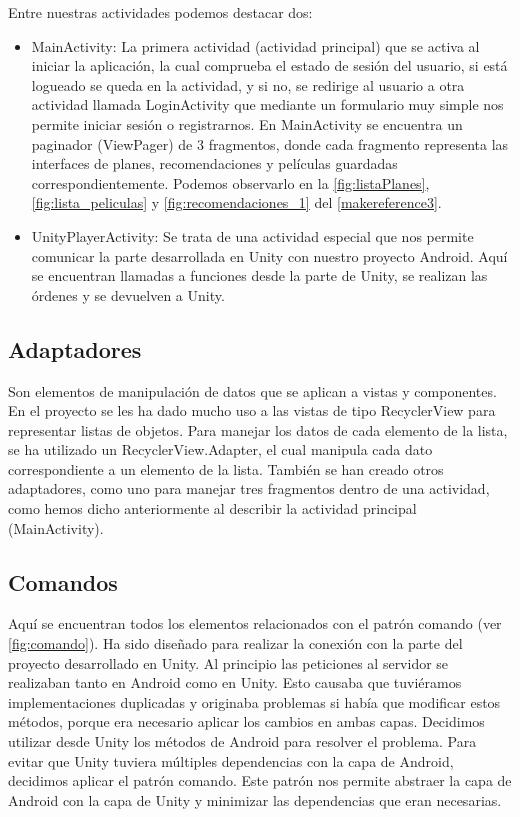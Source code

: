 Entre nuestras actividades podemos destacar dos: 
\begin{itemize}
    \item MainActivity: La primera actividad (actividad principal) que se activa al iniciar la aplicación, la cual comprueba el estado de sesión del usuario, si está logueado se queda en la actividad, y si no, se redirige al usuario a otra actividad llamada LoginActivity que mediante un formulario muy simple nos permite iniciar sesión o registrarnos. En MainActivity se encuentra un paginador (ViewPager) de 3 fragmentos, donde cada fragmento representa las interfaces de planes, recomendaciones y películas guardadas correspondientemente. Podemos observarlo en la \autoref{fig:listaPlanes}, \autoref{fig:lista_peliculas} y \autoref{fig:recomendaciones_1} del \autoref{makereference3}.
    \item UnityPlayerActivity: Se trata de una actividad especial que nos permite comunicar la parte desarrollada en Unity con nuestro proyecto Android. Aquí se encuentran llamadas a funciones desde la parte de Unity, se realizan las órdenes y se devuelven a Unity.
\end{itemize} 

\subsection{Adaptadores}
\label{makereference4.4.2} 
Son elementos de manipulación de datos que se aplican a vistas y componentes. En el proyecto se les ha dado mucho uso a las vistas de tipo RecyclerView para representar listas de objetos. Para manejar los datos de cada elemento de la lista, se ha utilizado un RecyclerView.Adapter, el cual manipula cada dato correspondiente a un elemento de la lista. También se han creado otros adaptadores, como uno para manejar tres fragmentos dentro de una actividad, como hemos dicho anteriormente al describir la actividad principal (MainActivity).

\subsection{Comandos}
\label{makereference4.4.3}
Aquí se encuentran todos los elementos relacionados con el patrón comando (ver \autoref{fig:comando}).
Ha sido diseñado para realizar la conexión con la parte del proyecto desarrollado en Unity.
Al principio las peticiones al servidor se realizaban tanto en Android como en
Unity. Esto causaba que tuviéramos implementaciones duplicadas y originaba
 problemas si había que modificar estos métodos, porque era necesario aplicar los
 cambios en ambas capas.
Decidimos utilizar desde Unity los métodos de Android para resolver el problema.
Para evitar que Unity tuviera múltiples dependencias con la capa de Android,
 decidimos aplicar el patrón comando.
Este patrón nos permite abstraer la capa de Android con la capa de Unity y
 minimizar las dependencias que eran necesarias.

